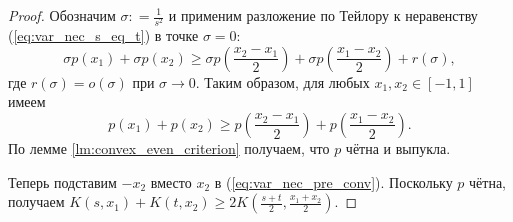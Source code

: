 \begin{proof}
Обозначим $\sigma: = {\frac 1 {s^2}}$ и применим разложение по Тейлору к неравенству (\ref{eq:var_nec_s_eq_t}) в точке $\sigma = 0$:
$$
\sigma p(x_1) + \sigma p(x_2) \ge \sigma p( {\frac { x_2 - x_1}2 } ) + \sigma p( {\frac { x_1 - x_2} 2 } ) + r(\sigma),
$$
где $r(\sigma) = o(\sigma)$ при $\sigma \to 0$.
Таким образом, для любых $x_1, x_2 \in [-1, 1]$ имеем
$$
p(x_1) + p(x_2) \ge p( { \frac {x_2 - x_1} 2 } ) + p( { \frac {x_1 - x_2} 2 } ).
$$
По лемме \ref{lm:convex_even_criterion} получаем, что $p$ чётна и выпукла.

Теперь подставим $-x_2$ вместо $x_2$ в (\ref{eq:var_nec_pre_conv}).
Поскольку $p$ чётна, получаем
$K(s, x_1) + K(t, x_2) \ge 2 K( { \frac {s + t}2 }, {\frac { x_1 + x_2}2 } )$.
\end{proof}
